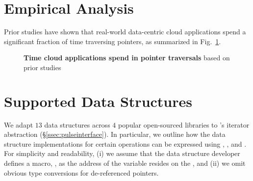 \section{\pulse Empirical Analysis}
Prior studies have shown that real-world data-centric cloud applications spend a significant fraction of time traversing pointers, as summarized in Fig.~\ref{fig:sup_motivation}.

\begin{figure}[b]
    \centering
    \footnotesize
            \label{tab:sup_motivation}
    \caption[Time cloud applications spend in pointer traversals]{\textbf{Time cloud applications spend in pointer traversals} based on prior studies}
    \label{fig:sup_motivation}
\end{figure}

\section{\pulse Supported Data Structures}

We adapt $13$ data structures across $4$ popular open-sourced libraries to \pulse's iterator abstraction (\S\ref{ssec:pulseinterface}). In particular, we outline how the data structure implementations for certain operations can be expressed using , , and . For simplicity and readability, (i) we assume that the data structure developer defines a macro, , as the address of the variable resides on the , and (ii) we omit obvious type conversions for de-referenced pointers. 

